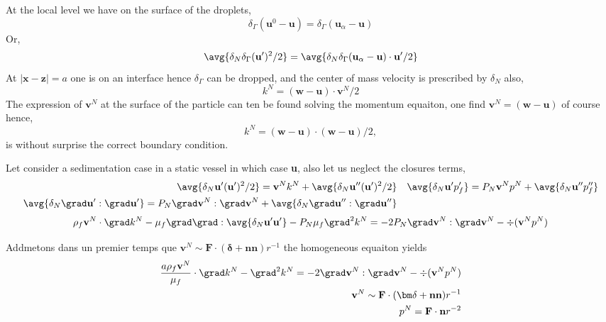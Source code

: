 At the local level we have on the surface of the droplets, 
\begin{equation}
    \delta_\Gamma(\textbf{u}^0 - \textbf{u} )= \delta_\Gamma (\textbf{u}_\alpha - \textbf{u})
\end{equation}
Or, 
\begin{equation}
    \avg{\delta_N\delta_\Gamma (\textbf{u}')^2/2} = \avg{\delta_N\delta_\Gamma (\textbf{u}_\alpha - \textbf{u})\cdot \textbf{u}'/2}
\end{equation}
At $|\textbf{x}-\textbf{z}| = a$ one is on an interface hence $\delta_\Gamma$ can be dropped, and the center of mass velocity is prescribed by $\delta_N$ also, 
\begin{equation}
    k^N = (\textbf{w} - \textbf{u})\cdot \textbf{v}^N /2 
\end{equation}
The expression of $\textbf{v}^N$ at the surface of the particle can ten be found solving the momentum equaiton, one find $\textbf{v}^N = (\textbf{w} - \textbf{u})$ of course hence, 
\begin{equation}
    k^N = (\textbf{w} - \textbf{u})\cdot (\textbf{w} - \textbf{u})/2 ,
\end{equation}
is without surprise the correct boundary condition. 


Let consider a sedimentation case in a static vessel in which case \textbf{u}, also let us neglect the closures terms, 
\begin{align}
     \avg{\delta_N \textbf{u}' (\textbf{u}')^2/2}
     =
     \textbf{v}^N  k^N 
     + \avg{\delta_N \textbf{u}'' (\textbf{u}')^2/2}
    &&
    \avg{\delta_N \textbf{u}' p_f'} 
    =
    P_N \textbf{v}^N p^N 
    + \avg{\delta_N \textbf{u}'' p_f''} \\
    \avg{ \delta_N \grad \textbf{u}' : \grad \textbf{u}'}
    =
    P_N \grad \textbf{v}^N  : \grad \textbf{v}^N
    + \avg{ \delta_N \grad \textbf{u}'' : \grad \textbf{u}''}
\end{align}
\begin{equation}
    \rho_f \textbf{v}^N \cdot \grad  k^N
    - \mu_f \grad\grad : \avg{\delta_N \textbf{u}'\textbf{u}'}  
    - P_N\mu_f  \grad^2 k^N
    =
    - 2 P_N \grad \textbf{v}^N  : \grad \textbf{v}^N
    - \div (\textbf{v}^N  p^N)
\end{equation}

Addmetons dans un premier temps que $\textbf{v}^N\sim \textbf{F}\cdot  (\bm\delta + \textbf{nn})r^{-1}$ 
the homogeneous equaiton yields
\begin{align}
    \frac{a \rho_f \textbf{v}^N}{\mu_f} \cdot \grad  k^N
    -  \grad^2 k^N
    =
    - 2 \grad \textbf{v}^N  : \grad \textbf{v}^N
    - \div (\textbf{v}^N  p^N)\\
    \textbf{v}^N \sim  \textbf{F}\cdot  (\bm\delta + \textbf{nn})r^{-1}\\
    p^N = \textbf{F}\cdot \textbf{n}r^{-2}
\end{align}

